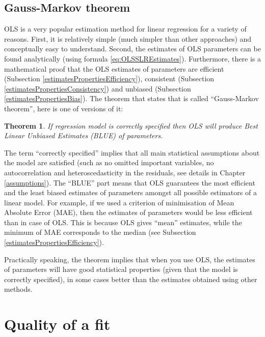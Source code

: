 \documentclass[
]{book}
\newtheorem{theorem}{Theorem}[chapter]
\theoremstyle{definition}
\theoremstyle{definition}
\theoremstyle{definition}
\theoremstyle{definition}
\theoremstyle{remark}
\begin{document}
\subsection{Gauss-Markov theorem}\label{GaussMarkov}

OLS is a very popular estimation method for linear regression for a variety of reasons. First, it is relatively simple (much simpler than other approaches) and conceptually easy to understand. Second, the estimates of OLS parameters can be found analytically (using formula \eqref{eq:OLSSLREstimates}). Furthermore, there is a mathematical proof that the OLS estimates of parameters are efficient (Subsection \ref{estimatesPropertiesEfficiency}), consistent (Subsection \ref{estimatesPropertiesConsistency}) and unbiased (Subsection \ref{estimatesPropertiesBias}). The theorem that states that is called ``Gauss-Markov theorem'', here is one of versions of it:

\begin{theorem}
If regression model is correctly specified then OLS will produce Best Linear Unbiased Estimates (BLUE) of parameters.
\end{theorem}

The term ``correctly specified'' implies that all main statistical assumptions about the model are satisfied (such as no omitted important variables, no autocorrelation and heteroscedasticity in the residuals, see details in Chapter \ref{assumptions}). The ``BLUE'' part means that OLS guarantees the most efficient and the least biased estimates of parameters amongst all possible estimators of a linear model. For example, if we used a criterion of minimisation of Mean Absolute Error (MAE), then the estimates of parameters would be less efficient than in case of OLS. This is because OLS gives ``mean'' estimates, while the minimum of MAE corresponds to the median (see Subsection \ref{estimatesPropertiesEfficiency}).

Practically speaking, the theorem implies that when you use OLS, the estimates of parameters will have good statistical properties (given that the model is correctly specified), in some cases better than the estimates obtained using other methods.

\section{Quality of a fit}\label{linearRegressionMultipleQualityOfFit}
\end{document}
